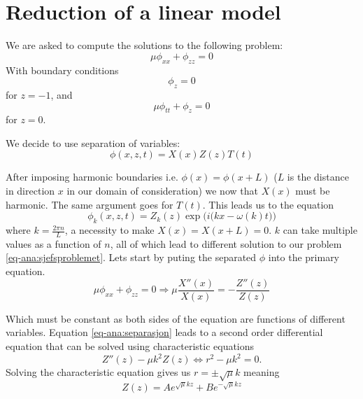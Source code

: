 \documentclass[11pt]{article}
\begin{document}
%
%
\section{Reduction of a linear model} 
We are asked to compute the solutions to the following problem:
\begin{equation}
\mu \phi _{xx} + \phi_{zz} = 0
\label{eq-ana:sjefsproblemet}
\end{equation}
With boundary conditions
\begin{equation}
\phi _z = 0
\end{equation}
for $z = -1$, and
\begin{equation}
\mu \phi_{tt} + \phi_z = 0
\end{equation}
for $z = 0$.

We decide to use separation of variables:
\begin{equation}
\phi(x,z,t) = X(x)Z(z)T(t)
\end{equation}

After imposing harmonic boundaries i.e. $\phi(x) = \phi(x+L)$ ($L$ is the distance in direction $x$ in our domain of consideration)
we now that $X(x)$ must be harmonic. The same argument goes for $T(t)$. This leads us to the equation
\begin{equation}
\phi_k (x,z,t) = Z_k(z) \exp \Big( i \big( kx - \omega(k)t \big) \Big)
\end{equation}
where $k=\frac{2 \pi n}{L}$, a necessity to make $X(x) = X(x+L) = 0$. $k$ can take multiple values as a function of $n$,
all of which lead to different solution to our problem \eqref{eq-ana:sjefsproblemet}. Lets start by puting the separated $\phi$ into the primary equation.
\begin{equation}
\mu \phi_{xx} + \phi_{zz} = 0 \Longrightarrow \mu \frac{X '' (x)}{X(x)} = -\frac{Z '' (z)}{Z(z)}
\label{eq-ana:separasjon}
\end{equation}

Which must be constant as both sides of the equation are functions of different variables. Equation \eqref{eq-ana:separasjon}
leads to a second order differential equation that can be solved using characteristic equations
\begin{equation}
Z''(z) - \mu k^2 Z(z) \Longleftrightarrow r^2 - \mu k^2 = 0.
\end{equation}
Solving the characteristic equation gives us $r = \pm \sqrt{\mu}k$ meaning
\begin{equation}
Z(z) = A e^{\sqrt{\mu}k z} + Be^{-\sqrt{\mu}k z}
\end{equation}
\end{document}
